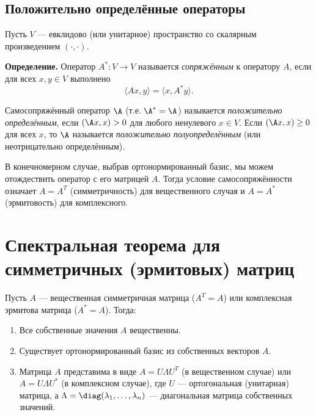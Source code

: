 \documentclass[10pt]{article}
\begin{document}
\subsection{Положительно определённые операторы}

Пусть $V$ — евклидово (или унитарное) пространство со скалярным произведением $(\cdot, \cdot)$.


\textbf{Определение.}
Оператор $A^*: V \to V$ называется \textit{сопряжённым} к оператору $A$, если для всех $x, y \in V$ выполнено
\[
\langle Ax, y \rangle = \langle x, A^* y \rangle.
\]

\begin{definition}
    Самосопряжённый оператор $\A$ (т.е. $\A^* = \A$) называется \textit{положительно определённым}, если $(\A x, x) > 0$ для любого ненулевого $x \in V$. Если $(\A x, x) \ge 0$ для всех $x$, то $\A$ называется \textit{положительно полуопределённым} (или неотрицательно определённым).
\end{definition}

\begin{remark}
    В конечномерном случае, выбрав ортонормированный базис, мы можем отождествить оператор с его матрицей $A$. Тогда условие самосопряжённости означает $A = A^T$ (симметричность) для вещественного случая и $A = A^*$ (эрмитовость) для комплексного.
\end{remark}


\section{Спектральная теорема для симметричных (эрмитовых) матриц}

\begin{theorem}
    Пусть $A$ — вещественная симметричная матрица ($A^T = A$) или комплексная эрмитова матрица ($A^* = A$). Тогда:
    \begin{enumerate}
        \item Все собственные значения $A$ вещественны.
        \item Существует ортонормированный базис из собственных векторов $A$.
        \item Матрица $A$ представима в виде $A = U \Lambda U^T$ (в вещественном случае) или $A = U \Lambda U^*$ (в комплексном случае), где $U$ — ортогональная (унитарная) матрица, а $\Lambda = \diag(\lambda_1,\dots,\lambda_n)$ — диагональная матрица собственных значений.
    \end{enumerate}
\end{theorem}
\end{document}
